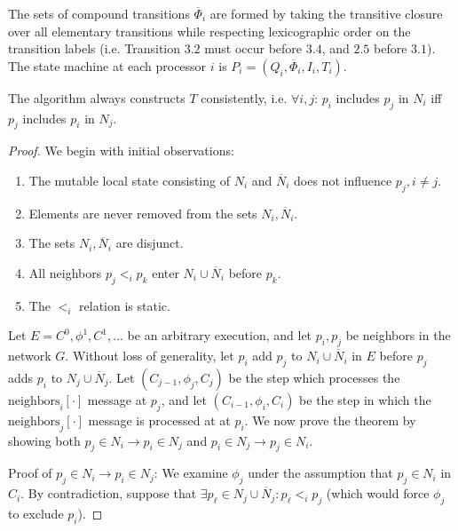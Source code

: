 The sets of compound transitions $\overline{\Phi}_i$ are formed by taking the transitive closure over all elementary
transitions while respecting lexicographic order on the transition labels (i.e. Transition $3.2$
must occur before $3.4$, and $2.5$ before $3.1$). The state machine at each processor $i$ is
$P_i = (Q_i, \overline{\Phi}_i, I_i, T_i)$.

\begin{theorem} \label{thm:tconsistent}
The algorithm always constructs $T$ consistently, i.e. $\forall i, j$:
$p_i$ includes $p_j$ in $N_i$ iff $p_j$ includes $p_i$ in $N_j$.
\end{theorem}

\begin{proof}
We begin with initial observations:

\begin{enumerate}
\item The mutable local state consisting of $N_i$ and
$\overline{N}_i$ does not influence $p_j, i \neq j$.
\item Elements are never removed from the sets $N_i, \overline{N}_i$.
\item The sets $N_i, \overline{N}_i$ are disjunct.
\item All neighbors $p_j <_i p_k$ enter $N_i \cup \overline{N}_i$ before $p_k$.
\item The $<_i$ relation is static.
\end{enumerate}

Let $E = C^0, \phi^1, C^1, \ldots$ be an arbitrary execution, and let $p_i, p_j$ be neighbors
in the network $G$. Without loss of generality, let $p_i$ add $p_j$ to $N_i \cup \overline{N}_i$
in $E$ before $p_j$ adds $p_i$ to $N_j \cup \overline{N}_j$. 
Let $(C_{j-1}, \phi_j, C_j)$ be the step which processes
the $\text{neighbors}_i[\cdot]$ message at $p_j$, and let $(C_{i-1}, \phi_i, C_i)$
be the step in which the $\text{neighbors}_j[\cdot]$ message is processed at at $p_i$.
We now prove the theorem by
showing both $p_j \in N_i \rightarrow p_i \in N_j$ and $p_i \in N_j \rightarrow p_j \in N_i$.

Proof of $p_j \in N_i \rightarrow p_i \in N_j$: 
We examine $\phi_j$ under the assumption that $p_j \in N_i$ in $C_i$.
By contradiction, suppose that $\exists p_\ell \in N_j \cup \overline{N}_j: 
p_\ell <_i p_j$ (which would force $\phi_j$ to exclude $p_i$). 


\end{proof}

